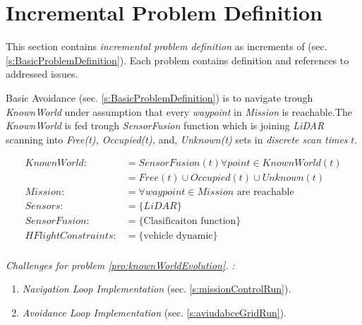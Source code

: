 \section{Incremental Problem Definition}\label{s:IncrementalProblemDefinition}

\noindent This section contains \emph{incremental problem definition} as increments of (sec. \ref{s:BasicProblemDefinition}). Each problem contains definition and references to addressed issues.

\begin{problem}{Basic Avoidance}\label{pro:knownWorldEvolution} (sec. \ref{s:BasicProblemDefinition}) is to navigate trough \emph{KnownWorld} under assumption that every \emph{waypoint} in \emph{Mission} is reachable.The \emph{KnownWorld} is fed trough \emph{SensorFusion} function which is joining \emph{LiDAR} scanning into \emph{Free(t), Occupied(t),} and, \emph{Unknown(t)} sets in \emph{discrete scan times} $t$. 

    \begin{equation}\label{eq:basicProblemDefinition}
        \begin{aligned}
            KnownWorld:&= SensorFusion(t)\forall point\in KnownWorld(t)\\
                       &=Free(t) \cup Occupied(t) \cup Unknown(t)\\
            Mission:&= \forall waypoint\in Mission \text{ are reachable}\\
            Sensors:&= \{LiDAR\}\\
            SensorFusion:&= \{\text{Clasificaiton function}\}\\
            HFlightConstraints:&=\{\text{vehicle dynamic}\}\\
        \end{aligned}
    \end{equation}
    
    
    \noindent \emph{Challenges for problem  \ref{pro:knownWorldEvolution}. :}
    \begin{enumerate}
        \item \emph{Navigation Loop Implementation} (sec. \ref{s:missionControlRun}).
        
        \item \emph{Avoidance Loop Implementation}  (sec. \ref{s:aviudabceGridRun}).
    \end{enumerate}   
\end{problem}


